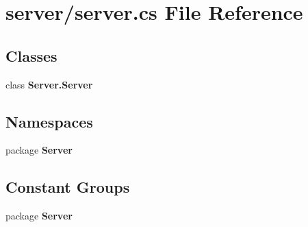 \section{server/server.cs File Reference}
\label{server_8cs}
\subsection*{Classes}
\begin{DoxyCompactItemize}
\item 
class {\bf Server.\-Server}
\end{DoxyCompactItemize}
\subsection*{Namespaces}
\begin{DoxyCompactItemize}
\item 
package {\bf Server}
\end{DoxyCompactItemize}
\subsection*{Constant Groups}
\begin{DoxyCompactItemize}
\item 
package {\bf Server}
\end{DoxyCompactItemize}
